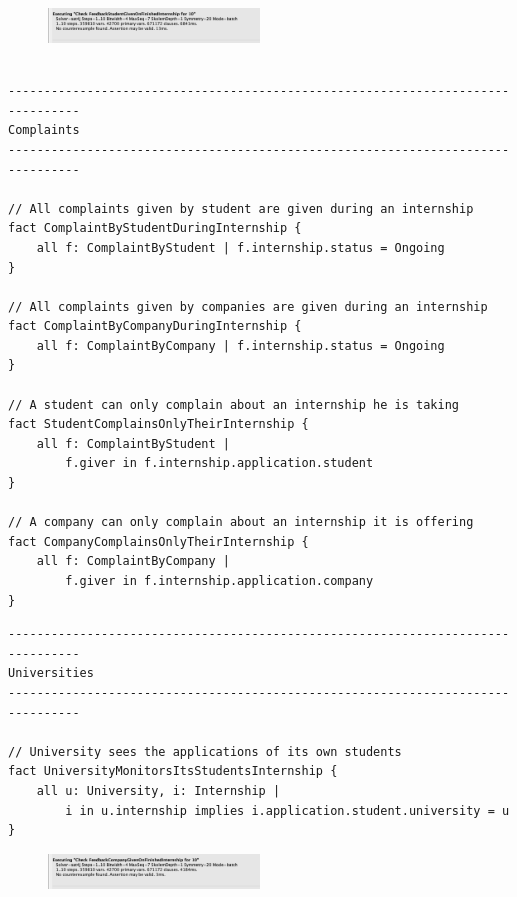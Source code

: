 \begin{figure}[h!]
    \centering\includegraphics[width=0.5\textwidth]{RASD/Images/Alloy/checkFeedbackStudentGivenOnFinishedInternship.png}
    \label{fig:checkFeedbackStudentGivenOnFinishedInternship}
\end{figure}
\newpage
\begin{verbatim}
   
--------------------------------------------------------------------------------
Complaints 
--------------------------------------------------------------------------------

// All complaints given by student are given during an internship 
fact ComplaintByStudentDuringInternship {
    all f: ComplaintByStudent | f.internship.status = Ongoing
}

// All complaints given by companies are given during an internship 
fact ComplaintByCompanyDuringInternship {
    all f: ComplaintByCompany | f.internship.status = Ongoing
}

// A student can only complain about an internship he is taking
fact StudentComplainsOnlyTheirInternship {
    all f: ComplaintByStudent | 
        f.giver in f.internship.application.student
}

// A company can only complain about an internship it is offering
fact CompanyComplainsOnlyTheirInternship {
    all f: ComplaintByCompany | 
        f.giver in f.internship.application.company
}
\end{verbatim}
\begin{verbatim}
--------------------------------------------------------------------------------
Universities 
--------------------------------------------------------------------------------

// University sees the applications of its own students 
fact UniversityMonitorsItsStudentsInternship {
    all u: University, i: Internship | 
        i in u.internship implies i.application.student.university = u
}

\end{verbatim}
\begin{figure}[h!]
    \centering\includegraphics[width=0.5\textwidth]{RASD/Images/Alloy/checkFeedbackCompanyGivenOnFinishedInternship.png}
    \label{fig:checkFeedbackCompanyGivenOnFinishedInternship}
\end{figure}

